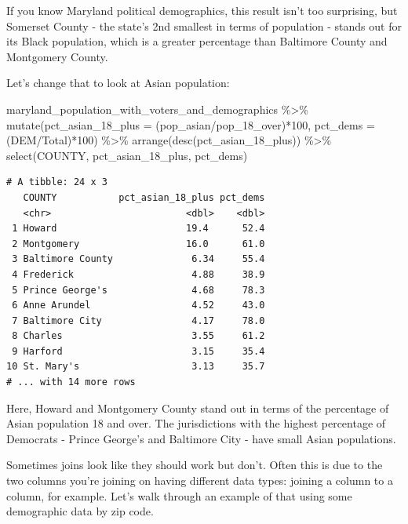 \documentclass[
  letterpaper,
  DIV=11,
  numbers=noendperiod]{scrreprt}
\newenvironment{Shaded}{\begin{snugshade}}{\end{snugshade}}
\newcommand{\AttributeTok}[1]{\textcolor[rgb]{0.40,0.45,0.13}{#1}}
\newcommand{\DecValTok}[1]{\textcolor[rgb]{0.68,0.00,0.00}{#1}}
\newcommand{\FunctionTok}[1]{\textcolor[rgb]{0.28,0.35,0.67}{#1}}
\newcommand{\NormalTok}[1]{\textcolor[rgb]{0.00,0.23,0.31}{#1}}
\newcommand{\SpecialCharTok}[1]{\textcolor[rgb]{0.37,0.37,0.37}{#1}}
\begin{document}
If you know Maryland political demographics, this result isn't too
surprising, but Somerset County - the state's 2nd smallest in terms of
population - stands out for its Black population, which is a greater
percentage than Baltimore County and Montgomery County.

Let's change that to look at Asian population:

\begin{Shaded}
\begin{Highlighting}[]
\NormalTok{maryland\_population\_with\_voters\_and\_demographics }\SpecialCharTok{\%\textgreater{}\%}
  \FunctionTok{mutate}\NormalTok{(}\AttributeTok{pct\_asian\_18\_plus =}\NormalTok{ (pop\_asian}\SpecialCharTok{/}\NormalTok{pop\_18\_over)}\SpecialCharTok{*}\DecValTok{100}\NormalTok{, }\AttributeTok{pct\_dems =}\NormalTok{ (DEM}\SpecialCharTok{/}\NormalTok{Total)}\SpecialCharTok{*}\DecValTok{100}\NormalTok{) }\SpecialCharTok{\%\textgreater{}\%}
  \FunctionTok{arrange}\NormalTok{(}\FunctionTok{desc}\NormalTok{(pct\_asian\_18\_plus)) }\SpecialCharTok{\%\textgreater{}\%}
  \FunctionTok{select}\NormalTok{(COUNTY, pct\_asian\_18\_plus, pct\_dems)}
\end{Highlighting}
\end{Shaded}

\begin{verbatim}
# A tibble: 24 x 3
   COUNTY           pct_asian_18_plus pct_dems
   <chr>                        <dbl>    <dbl>
 1 Howard                       19.4      52.4
 2 Montgomery                   16.0      61.0
 3 Baltimore County              6.34     55.4
 4 Frederick                     4.88     38.9
 5 Prince George's               4.68     78.3
 6 Anne Arundel                  4.52     43.0
 7 Baltimore City                4.17     78.0
 8 Charles                       3.55     61.2
 9 Harford                       3.15     35.4
10 St. Mary's                    3.13     35.7
# ... with 14 more rows
\end{verbatim}

Here, Howard and Montgomery County stand out in terms of the percentage
of Asian population 18 and over. The jurisdictions with the highest
percentage of Democrats - Prince George's and Baltimore City - have
small Asian populations.

Sometimes joins look like they should work but don't. Often this is due
to the two columns you're joining on having different data types:
joining a column to a column, for example. Let's walk through an example
of that using some demographic data by zip code.
\end{document}
